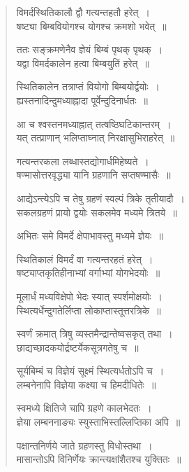 \documentclass[11pt, openany]{book}
\begin{document}
\begin{quote}
{\qt विमर्दस्थितिकालौ द्वौ गत्यन्तहतौ हरेत्~।\\
 षष्ट्या बिम्बवियोगश्च योगश्च क्रमशो भवेत्~॥ 
 
ततः सङ्क्रमणेनैव ज्ञेयं बिम्बं पृथक् पृथक्~।\\
यद्वा विमर्दकालेन हत्वा बिम्बयुतिं हरेत्~॥
 
स्थितिकालेन तत्राप्तं वियोगो बिम्बयोर्द्वयोः~।\\
ह्यस्तनादिन्दुमध्याह्नादा पूर्वेन्दुदिनार्धतः~॥
 
आ च श्वस्तनमध्याह्नात् तत्षष्ठिघटिकान्तरम्~।\\
यत् तत्प्राणान् भलिप्ताघ्नात् निरक्षासुभिराहरेत्~॥
 
गत्यन्तरकला लब्धास्तद्योगार्धमिहेष्यते~।\\
षण्मासोत्तरवृद्ध्या यानि ग्रहणानि सप्तषण्मासैः~॥
 
आद्येऽन्त्येऽपि च तेषु ग्रहणं स्वल्पं त्रिके तृतीयादौ~।\\
सकलग्रहणं प्रायो द्वयोः सकलमेव मध्यमे त्रितये~॥
 
अभितः समे विमर्दे क्षेपाभावस्तु मध्यमे ज्ञेयः~॥
 
स्थितिकालं विमर्दं वा गत्यन्तरहतं हरेत्~।\\
षष्ट्याप्तकृतिहीनाभ्यां वर्गाभ्यां योगभेदयोः~॥
 
मूलार्धं मध्यविक्षेपो भेदः स्यात् स्पर्शमोक्षयोः~।\\
स्थित्यर्धेन्दुगतेर्लिप्ता लोकाप्तास्तूत्तरत्रिके~॥
 
स्वर्णं क्रमात् त्रिषु व्यस्तमैन्द्रान्तेष्वसकृत् तथा~।\\
छाद्यच्छादकयोर्द्रष्टर्येकसूत्रगतेषु च~॥
 
सूर्यबिम्बं च विज्ञेयं सूक्ष्मं स्थित्यर्धतोऽपि च~।\\
लम्बनेनापि विज्ञेया कक्ष्या च हिमदीधितेः~॥
 
स्वमध्ये क्षितिजे चापि ग्रहणे कालभेदतः~।\\
ज्ञेया लम्बननाङ्यः स्युस्ताभिस्तल्लिप्तिका अपि~॥
 
पक्षान्तनिर्णये जाते ग्रहणस्तु विधोस्तथा~।\\
मासान्तोऽपि विनिर्णेयः क्रान्त्यक्षांशैतश्च युक्तितः~॥}
\end{quote}

\newpage
\end{document}
